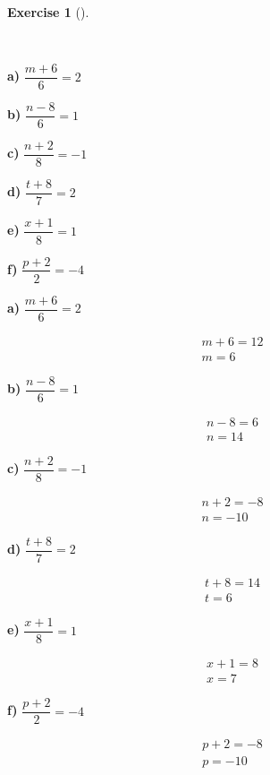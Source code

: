 \documentclass[
  letterpaper,
  DIV=11,
  numbers=noendperiod]{scrreprt}
\theoremstyle{definition}
\newtheorem{exercise}{Exercise}[chapter]
\theoremstyle{remark}
\begin{document}
\begin{exercise}[]\protect\hypertarget{exr-u5-5}{}\label{exr-u5-5}

~

\textbf{a)} \(\displaystyle \dfrac{m + 6}{6} = 2\)

\textbf{b)} \(\displaystyle \dfrac{n - 8}{6} = 1\)

\textbf{c)} \(\displaystyle \dfrac{n + 2}{8} = -1\)

\textbf{d)} \(\displaystyle \dfrac{t + 8}{7} = 2\)

\textbf{e)} \(\displaystyle \dfrac{x + 1}{8} = 1\)

\textbf{f)} \(\displaystyle \dfrac{p + 2}{2} = -4\)

\begin{tcolorbox}[enhanced jigsaw, opacitybacktitle=0.6, coltitle=black, arc=.35mm, colframe=quarto-callout-tip-color-frame, colback=white, bottomrule=.15mm, left=2mm, colbacktitle=quarto-callout-tip-color!10!white, titlerule=0mm, opacityback=0, title=\textcolor{quarto-callout-tip-color}{\faLightbulb}\hspace{0.5em}{🔍 View Solutions}, leftrule=.75mm, breakable, rightrule=.15mm, bottomtitle=1mm, toptitle=1mm, toprule=.15mm]

\textbf{a)} \(\displaystyle \dfrac{m + 6}{6} = 2\)

\begin{align*}
m + 6 = 12 \\ m = 6
\end{align*}

\textbf{b)} \(\displaystyle \dfrac{n - 8}{6} = 1\)

\begin{align*}
n - 8 = 6 \\ n = 14
\end{align*}

\textbf{c)} \(\displaystyle \dfrac{n + 2}{8} = -1\)

\begin{align*}
n + 2 = -8 \\ n = -10
\end{align*}

\textbf{d)} \(\displaystyle \dfrac{t + 8}{7} = 2\)

\begin{align*}
t + 8 = 14 \\ t = 6
\end{align*}

\textbf{e)} \(\displaystyle \dfrac{x + 1}{8} = 1\)

\begin{align*}
x + 1 = 8 \\ x = 7
\end{align*}

\textbf{f)} \(\displaystyle \dfrac{p + 2}{2} = -4\)

\begin{align*}
p + 2 = -8 \\ p = -10
\end{align*}

\end{tcolorbox}

\end{exercise}
\end{document}
